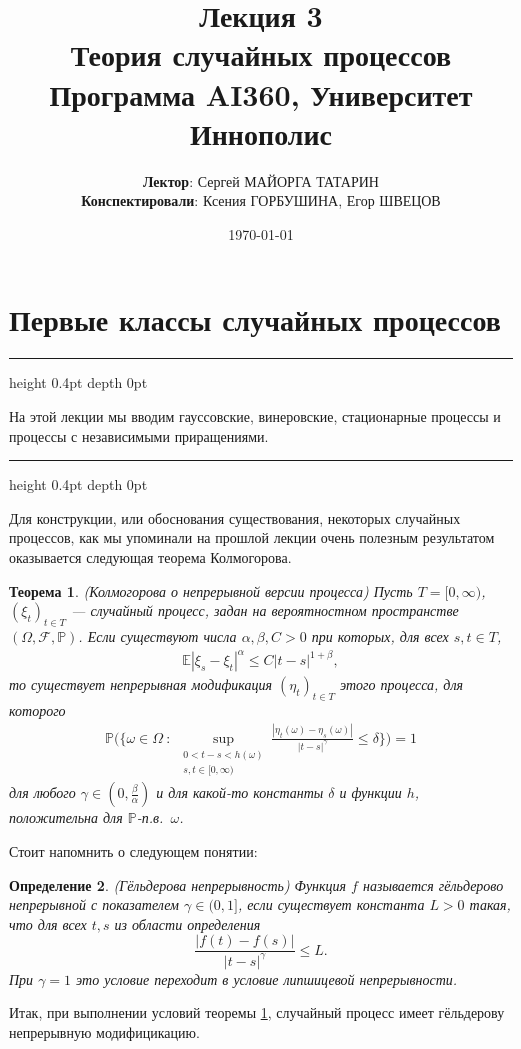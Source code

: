 \documentclass[10pt]{article}
\author{\textbf{Лектор}: Сергей МАЙОРГА ТАТАРИН \\ \textbf{Конспектировали}: Ксения ГОРБУШИНА, Егор ШВЕЦОВ}
\date{\today}
\title{Лекция 3 \\ Теория случайных процессов \\ Программа AI360, Университет Иннополис}
\newtheorem{thm}{Теорема}[section]
\newtheorem{defn}[thm]{Определение}
\theoremstyle{boldnormal}
\newcommand{\PP}{{\ensuremath{\mathbb{P}}}}
\newcommand{\EE}{{\ensuremath{\mathbb{E}}}}
\theoremstyle{boldremark}
\newenvironment{sectionabstract}{%
  \par\vspace{3pt}%
  \hrule height 0.4pt depth 0pt \relax
  \vspace{3pt}%
  \itshape\small
  \list{}{%
    \leftmargin=2em
    \rightmargin=2em
    \topsep=0pt
    \parsep=0pt
  }%
  \item\relax
}{%
  \endlist
  \par\vspace{3pt}%
  \hrule height 0.4pt depth 0pt \relax
  \vspace{3pt}%
}
\begin{document}
\maketitle

\section{Первые классы случайных процессов}
\begin{sectionabstract}
    На этой лекции мы вводим 
гауссовские, винеровские, стационарные процессы и процессы 
с независимыми приращениями.
\end{sectionabstract}

Для конструкции, или обоснования существования,
некоторых случайных процессов, как мы упоминали на прошлой 
лекции очень полезным результатом оказывается следующая 
теорема Колмогорова.
\begin{thm}\label{thm:kolmogorovcontver} (Колмогорова о непрерывной 
  версии процесса)
Пусть \(T=[0,\infty)\), \((\xi_t)_{t\in T}\) --- случайный процесс,
задан на вероятностном пространстве \((\Omega,\mathscr{F},\PP)\). Если
существуют числа \(\alpha,\beta,C>0\) при которых, для 
всех \(s,t\in T\), 
\begin{align*}
  \EE|\xi_s-\xi_t|^{\alpha} \leq C |t-s|^{1+\beta},
\end{align*}
то существует непрерывная модификация \((\eta_t)_{t\in T}\) 
этого процесса, для которого 
\begin{align*}
  \PP\big( \big\{ \omega \in \Omega \ : \
  \sup_{\substack{ 0<t-s<h(\omega)\\ s,t\in [0,\infty) }}
  \frac{|\eta_t(\omega)-\eta_s(\omega)|}{|t-s|^{\gamma}} 
  \leq \delta
  \big\}  \big) = 1
\end{align*}
для любого \(\gamma\in (0,\frac{\beta}{\alpha})\) и 
для какой-то константы \(\delta\) и функции \(h\),
положительна для \(\mathbb{P}\)-п.в.~\(\omega\).
\end{thm}

Стоит напомнить о следующем понятии:
\begin{defn}
(Гёльдерова непрерывность)
Функция $f$ называется \emph{гёльдерово непрерывной}
с показателем $\gamma\in(0,1]$, если существует константа $L>0$
такая, что для всех $t,s$ из области определения
\[
\frac{|f(t)-f(s)|}{|t-s|^\gamma}\le L.
\]
При $\gamma=1$ это условие переходит в условие липшицевой непрерывности.
\end{defn}
Итак, при выполнении условий теоремы \ref{thm:kolmogorovcontver},
случайный процесс имеет гёльдерову непрерывную модифицикацию.
\end{document}
